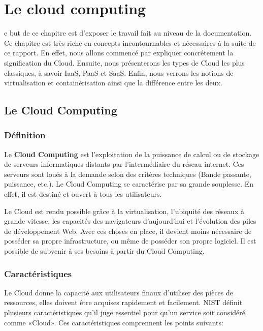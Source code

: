\chapter{Le cloud computing}
\begin{onehalfspace}

 e but de ce chapitre est d'exposer le travail fait au niveau de la documentation. Ce chapitre est très riche en concepts incontournables et nécessaires à la suite de ce rapport. En effet, nous allons commencé par expliquer concrétement la signification du Cloud. Ensuite, nous présenterons les types de Cloud les plus classiques, à savoir IaaS, PaaS et SaaS. Enfin, nous verrons les notions de virtualisation et containérisation ainsi que la différence entre les deux.


\newpage


\section{Le Cloud Computing}

\subsection{Définition}

Le \textbf{Cloud Computing} est l'exploitation de la puissance de calcul ou de stockage de serveurs informatiques distants par l'intermédiaire du réseau internet. Ces serveurs sont loués à la demande selon des critères techniques (Bande passante, puissance, etc.). Le Cloud Computing se caractérise par sa grande souplesse. En effet, il est destiné et ouvert à tous les utilisateurs.

Le Cloud est rendu possible grâce à la virtualisation, l'ubiquité des réseaux à grande vitesse, les capacités des navigateurs d'aujourd'hui et l'évolution des piles de développement Web. Avec ces choses en place, il devient moins nécessaire de posséder sa propre infrastructure, ou même de posséder son propre logiciel. Il est possible de subvenir à ses besoins à partir du Cloud Computing.


\subsection{Caractéristiques}

Le Cloud donne la capacité aux utilisateurs finaux d'utiliser des pièces de ressources, elles doivent être acquises rapidement et facilement. NIST définit plusieurs caractéristiques qu'il juge essentiel pour qu'un service soit considéré comme «Cloud». Ces caractéristiques comprennent les points suivants:


\end{onehalfspace}
